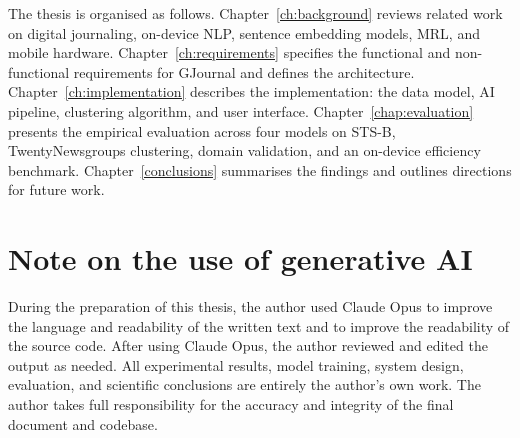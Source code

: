 The thesis is organised as follows. Chapter~\ref{ch:background} reviews related work on digital journaling, on-device NLP, sentence embedding models, MRL, and mobile hardware. Chapter~\ref{ch:requirements} specifies the functional and non-functional requirements for GJournal and defines the architecture. Chapter~\ref{ch:implementation} describes the implementation: the data model, AI pipeline, clustering algorithm, and user interface. Chapter~\ref{chap:evaluation} presents the empirical evaluation across four models on STS-B, TwentyNewsgroups clustering, domain validation, and an on-device efficiency benchmark. Chapter~\ref{conclusions} summarises the findings and outlines directions for future work.

\section*{Note on the use of generative AI}
During the preparation of this thesis, the author used Claude Opus to improve the language and readability of the written text and to improve the readability of the source code. After using Claude Opus, the author reviewed and edited the output as needed. All experimental results, model training, system design, evaluation, and scientific conclusions are entirely the author's own work. The author takes full responsibility for the accuracy and integrity of the final document and codebase.

